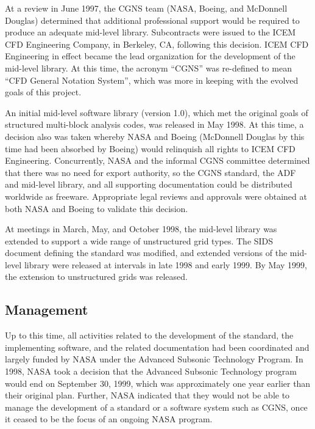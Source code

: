 At a review in June 1997, the CGNS team (NASA, Boeing, and McDonnell
Douglas) determined that additional professional support would be
required to produce an adequate mid-level library.
Subcontracts were issued to the ICEM
CFD Engineering Company, in Berkeley, CA, following this decision.
ICEM CFD Engineering in effect became the lead organization for the
development of the mid-level library.
At this time, the acronym ``CGNS'' was re-defined to mean ``CFD General
Notation System'', which was more in keeping with the evolved goals of
this project.

An initial mid-level software library (version 1.0), which met the
original goals of structured multi-block analysis codes, was released
in May 1998.
At this time, a decision also was taken whereby NASA and Boeing
(McDonnell Douglas by this time had been absorbed by Boeing) would
relinquish all rights to ICEM CFD Engineering.
Concurrently, NASA and the informal CGNS committee determined that there
was no need for export authority, so the CGNS standard, the ADF and
mid-level library, and all supporting documentation could be distributed
worldwide as freeware.
Appropriate legal reviews and approvals were obtained at both NASA and
Boeing to validate this decision.

At meetings in March, May, and October 1998, the mid-level library was
extended to support a wide range of unstructured grid types.
The SIDS document defining the standard was modified, and extended
versions of the mid-level library were released at intervals in late
1998 and early 1999.
By May 1999, the extension to unstructured grids was released.

\subsection{Management}
\label{s:management}

Up to this time, all activities related to the development of the
standard, the implementing software, and the related documentation had
been coordinated and largely funded by NASA under the Advanced Subsonic
Technology Program.
In 1998, NASA took a decision that the Advanced Subsonic Technology
program would end on September 30, 1999, which was approximately one
year earlier than their original plan.
Further, NASA indicated that they would not be able to manage the
development of a standard or a software system such as CGNS, once it
ceased to be the focus of an ongoing NASA program.

